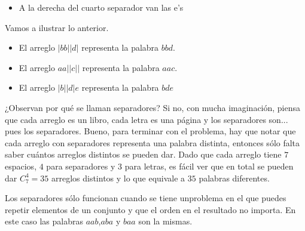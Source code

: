 \documentclass[12pt]{article}
\begin{document}
\begin{solucion}
\begin{itemize}
    \item A la derecha del cuarto separador van las e’s
\end{itemize}
Vamos a ilustrar lo anterior.
\begin{itemize}
    \item El arreglo $|bb||d|$ representa la palabra $bbd$.
    \item El arreglo $aa||c||$ representa la palabra $aac$.
    \item El arreglo $|b||d|e$ representa la palabra $bde$
\end{itemize}
¿Observan por qué se llaman separadores? Si no, con mucha imaginación, piensa que cada arreglo es un libro, cada letra es una página y los separadores son... pues los separadores.
Bueno, para terminar con el problema, hay que notar que cada arreglo con separadores representa una palabra distinta, entonces sólo falta saber cuántos arreglos distintos se pueden dar. Dado que cada arreglo tiene $7$ espacios, $4$ para separadores y $3$ para letras, es fácil ver que en total se pueden dar $C^4_7=35$ arreglos distintos y lo que equivale a $35$ palabras diferentes.
\end{solucion}
\begin{observacion}
Los  separadores  sólo  funcionan  cuando  se  tiene  unproblema en el que puedes repetir elementos de un conjunto y que el orden en el resultado no importa.  En este caso las palabras $aab$,$aba$ y $baa$ son la mismas.
\end{observacion}
\end{document}
